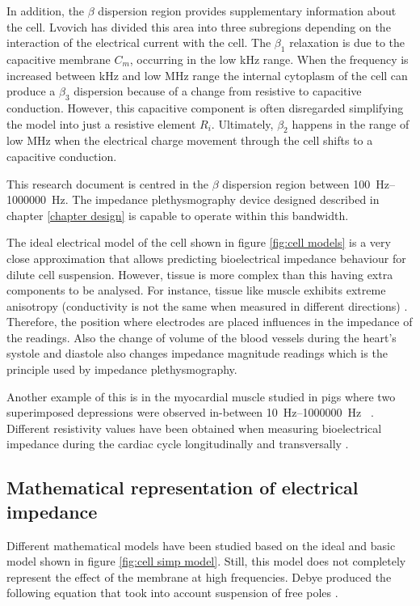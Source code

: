 In addition, the $\beta$ dispersion region provides supplementary information about the cell. Lvovich \cite{lvovich2012impedance} has divided this area into three subregions depending on the interaction of the electrical current with the cell. The $\beta_1$ relaxation is due to the capacitive membrane $C_m$, occurring in the low \si{\kilo\hertz} range. When the frequency is increased between \si{\kilo\hertz} and low \si{\mega\hertz} range the internal cytoplasm of the cell can produce a $\beta_3$ dispersion because of a change from resistive to capacitive conduction. However, this capacitive component is often disregarded simplifying the model into just a resistive element $R_i$. Ultimately, $\beta_2$ happens in the range of low \si{\mega\hertz} when the electrical charge movement through the cell shifts to a capacitive conduction.

This research document is centred in the $\beta$ dispersion region between \SIrange[scientific-notation = engineering]{100}{1000000}{\hertz}. The impedance plethysmography device designed described in chapter \ref{chapter design} is capable to operate within this bandwidth. 

The ideal electrical model of the cell shown in figure \ref{fig:cell models} is a very close approximation that allows predicting bioelectrical impedance behaviour for dilute cell suspension. However, tissue is more complex than this having extra components to be analysed. For instance, tissue like muscle exhibits extreme anisotropy (conductivity is not the same when measured in different directions) \cite{lvovich2012impedance,dean2008electrical,foster1995dielectric}. Therefore, the position where electrodes are placed influences in the impedance of the readings. Also the change of volume of the blood vessels during the heart’s systole and diastole also changes impedance magnitude readings which is the principle used by impedance plethysmography. 

Another example of this is in the myocardial muscle studied in pigs where two superimposed depressions were observed in-between \SIrange[scientific-notation = engineering]{10}{1000000}{\hertz} ~\cite{casas1999vivo}. Different resistivity values have been obtained when measuring bioelectrical impedance during the cardiac cycle longitudinally and transversally \cite{steendijk1993four}. 

\subsection{Mathematical representation of electrical impedance}
Different mathematical models have been studied based on the ideal and basic model shown in figure \ref{fig:cell simp model}. Still, this model does not completely represent the effect of the membrane at high frequencies. Debye produced the following equation that took into account suspension of free poles \cite{bertemes2002tissue}.

